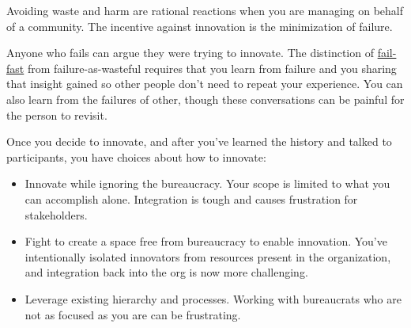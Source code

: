 Avoiding waste and harm are rational reactions when you are managing \iftoggle{glossarysubstitutionworks}{\glspl{shared resource}}{shared resources} on behalf 
of a community. The incentive against innovation is the minimization of failure.

Anyone who fails can argue they were trying to innovate. The distinction of \href{https://en.wikipedia.org/wiki/Fail-fast\%23Business}{fail-fast}\iftoggle{WPinmargin}{\marginpar{$>$Wikipedia: Fail-fast}}{}%
 from failure-as-wasteful requires that you learn from failure and you sharing that insight gained so other people don't need to repeat your experience. You can also learn from the failures of other, though these conversations can be painful for the person to revisit.


Once you decide to innovate, and after you've learned the history and talked to participants, you have choices about how to innovate:
\begin{itemize}
\item Innovate while ignoring the bureaucracy. Your scope is limited to what you can accomplish alone. Integration is tough and causes frustration for stakeholders.
\item Fight to create a space free from bureaucracy to enable innovation. You've intentionally isolated innovators from resources present in the organization, and integration back into the org is now more challenging. 
\item Leverage existing hierarchy and processes. Working with bureaucrats who are not as focused as you are can be frustrating.
\end{itemize}


